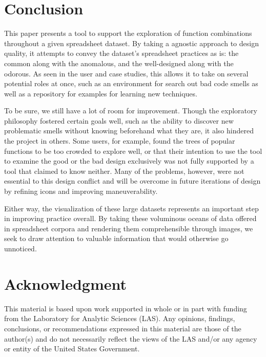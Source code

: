 \documentclass[conference]{IEEEtran}
\begin{document}
	\section{Conclusion} This paper presents a tool to support the exploration of
	function combinations throughout a given spreadsheet dataset. By taking a
	agnostic approach to design quality, it attempts to convey the dataset's
	spreadsheet practices as is: the common along with the anomalous, and the
	well-designed along with the odorous. As seen in the user and case studies,
	this allows it to take on several potential roles at once, such as an
	environment for search out bad code smells as well as a repository for examples
	for learning new techniques. \par
	
	To be sure, we still have a lot of room for improvement. Though the exploratory
	philosophy fostered certain goals well, such as the ability to discover new
	problematic smells without knowing beforehand what they are, it also hindered
	the project in others. Some users, for example, found the trees of popular
	functions to be too crowded to explore well, or that their intention to use the
	tool to examine the good or the bad design exclusively was not fully supported
	by a tool that claimed to know neither. Many of the problems, however, were not
	essential to this design conflict and will be overcome in future iterations of
	design by refining icons and improving maneuverability. \par
	
	Either way, the visualization of these large datasets represents an important
	step in improving practice overall. By taking these voluminous oceans of data
	offered in spreadsheet corpora and rendering them comprehensible through
	images, we seek to draw attention to valuable information that would otherwise
	go unnoticed.
	
	\section*{Acknowledgment} This material is based upon work supported in whole
	or in part with funding from the Laboratory for Analytic Sciences (LAS). Any
	opinions, findings, conclusions, or recommendations expressed in this material
	are those of the author(s) and do not necessarily reflect the views of the LAS
	and/or any agency or entity of the United States Government.
	
	
\end{document}
